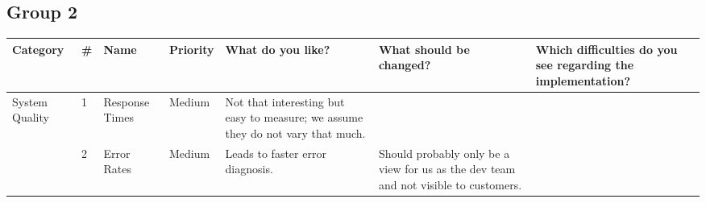 \documentclass[
	english,
	ruledheaders=section,%
	class=report,%
	thesis={type=bachelor},%
	accentcolor=1b,%
	custommargins=true,%
	marginpar=false,%
	parskip=half-,%
	fontsize=11pt,%
	DIV=14,
]{tudapub}
\begin{document}
\subsection*{Group 2}
\begin{sideways}
    \begin{minipage}{\textheight}
        \centering
        \small
        \label{tab:system_quality_g2}
        \begin{tabularx}{\linewidth}{p{2.2cm} l >{\RaggedRight\arraybackslash}X l >{\RaggedRight\arraybackslash}X >{\RaggedRight\arraybackslash}X >{\RaggedRight\arraybackslash}X} %
            \toprule
            \textbf{Category} & \textbf{\#} & \textbf{Name} & \textbf{Priority} & \textbf{What do you like?} & \textbf{What should be changed?} & \textbf{Which difficulties do you see regarding the implementation?} \\
            \midrule
            
            \multirow{2}{=}{System Quality} 
            & 1 & Response Times & Medium & Not that interesting but easy to measure; we assume they do not vary that much. & & \\
            \cmidrule(l){2-7}
            & 2 & Error Rates & Medium & Leads to faster error diagnosis. & Should probably only be a view for us as the dev team and not visible to customers. & \\
            \bottomrule
        \end{tabularx}
    \end{minipage}
\end{sideways}
\end{document}

